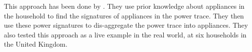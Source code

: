 This approach has been done by \citet{NILM}.
They use prior knowledge about appliances in the household to find the signatures of appliances in the power trace.
They then use these power signatures to dis-aggregate the power trace into appliances.
They also tested this approach as a live example in the real world, at six households in the United Kingdom.
